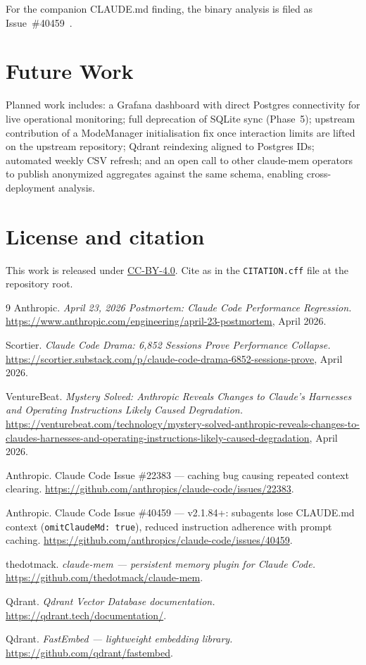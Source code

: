 \documentclass[11pt,a4paper]{article}
\begin{document}
For the companion CLAUDE.md finding, the binary analysis is filed as
Issue~\#40459~\cite{issue40459}.

\section{Future Work}

Planned work includes: a Grafana dashboard with direct Postgres connectivity
for live operational monitoring; full deprecation of SQLite sync (Phase~5);
upstream contribution of a ModeManager initialisation fix once interaction
limits are lifted on the upstream repository; Qdrant reindexing aligned to
Postgres IDs; automated weekly CSV refresh; and an open call to other
claude-mem operators to publish anonymized aggregates against the same schema,
enabling cross-deployment analysis.

\section*{License and citation}

This work is released under \href{https://creativecommons.org/licenses/by/4.0/}{CC-BY-4.0}.
Cite as in the \texttt{CITATION.cff} file at the repository root.

\begin{thebibliography}{9}
\small
{}
Anthropic.
\emph{April 23, 2026 Postmortem: Claude Code Performance Regression.}
\url{https://www.anthropic.com/engineering/april-23-postmortem}, April 2026.

Scortier.
\emph{Claude Code Drama: 6{,}852 Sessions Prove Performance Collapse.}
\url{https://scortier.substack.com/p/claude-code-drama-6852-sessions-prove},
April 2026.

VentureBeat.
\emph{Mystery Solved: Anthropic Reveals Changes to Claude's Harnesses and Operating
Instructions Likely Caused Degradation.}
\url{https://venturebeat.com/technology/mystery-solved-anthropic-reveals-changes-to-claudes-harnesses-and-operating-instructions-likely-caused-degradation},
April 2026.

Anthropic.
Claude Code Issue \#22383 --- caching bug causing repeated context clearing.
\url{https://github.com/anthropics/claude-code/issues/22383}.

Anthropic.
Claude Code Issue \#40459 --- v2.1.84+: subagents lose CLAUDE.md context
(\texttt{omitClaudeMd:\,true}), reduced instruction adherence with prompt
caching.
\url{https://github.com/anthropics/claude-code/issues/40459}.

thedotmack.
\emph{claude-mem --- persistent memory plugin for Claude Code.}
\url{https://github.com/thedotmack/claude-mem}.

Qdrant.
\emph{Qdrant Vector Database documentation.}
\url{https://qdrant.tech/documentation/}.

Qdrant.
\emph{FastEmbed --- lightweight embedding library.}
\url{https://github.com/qdrant/fastembed}.

\end{thebibliography}
\end{document}
